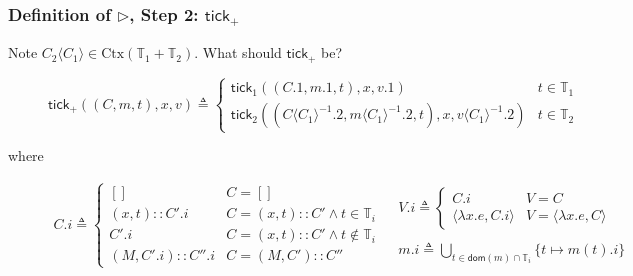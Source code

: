 \documentclass{beamer}
\newcommand*{\cons}{::}
\newcommand*{\Time}{\mathbb{T}}
\newcommand*{\Ctx}{\text{Ctx}}
\newcommand*{\mem}{m}
\newcommand*{\tick}{\mathsf{tick}}
\newcommand*{\inject}[2]{{#2}\langle{#1}\rangle}
\newcommand*{\delete}[2]{{#2}{\langle{#1}\rangle}^{-1}}
\begin{document}
\begin{frame}[c]
  \frametitle{Definition of $\rhd$, Step 2: $\tick_+$}
  Note $\inject{C_1}{C_2}\in\Ctx(\Time_1+\Time_2)$. What should $\tick_+$ be?

  \begin{figure}[h!]
    \footnotesize
    \[
      \tick_+((C,\mem,t),x,v)\triangleq
      \begin{cases}
        \tick_1((C.1,\mem.1,t),x,v.1)                                           & t\in\Time_1 \\
        \tick_2((\delete{C_1}{C}.2,\delete{C_1}{\mem}.2,t),x,\delete{C_1}{v}.2) & t\in\Time_2
      \end{cases}
    \]
  \end{figure}
  where
  \begin{figure}[h!]
    \footnotesize
    \[
      \begin{array}{cc}
        C.i\triangleq
        \begin{cases}
          []                  & C=[]                                    \\
          (x,t)\cons C'.i     & C=(x,t)\cons C'\wedge t\in{\Time_i}     \\
          C'.i                & C=(x,t)\cons C'\wedge t\not\in{\Time_i} \\
          (M,C'.i)\cons C''.i & C=(M, C')\cons C''
        \end{cases} &
        \begin{array}{l}
          V.i\triangleq
          \begin{cases}
            C.i                           & V=C                           \\
            \langle\lambda x.e,C.i\rangle & V=\langle\lambda x.e,C\rangle
          \end{cases} \\ \\
          \mem.i\triangleq
          \displaystyle\bigcup_{t\in\mathsf{dom}(\mem)\cap\Time_i}\{t\mapsto \mem(t).i\}
        \end{array}
      \end{array}
    \]
  \end{figure}
\end{frame}
\end{document}
